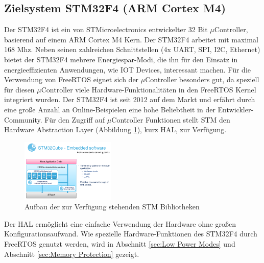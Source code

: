 \subsection{Zielsystem STM32F4 (ARM Cortex M4)}
\label{sec:Zielsysteme}
Der STM32F4 ist ein von STMicroelectronics entwickelter 32 Bit $\mu$Controller, basierend auf einem ARM Cortex M4 Kern. Der STM32F4 arbeitet mit maximal 168 Mhz. \newline
Neben seinen zahlreichen Schnittstellen (4x UART, SPI, I2C, Ethernet) bietet der STM32F4 mehrere Energiespar-Modi, die ihn für den Einsatz in energieeffizienten Anwendungen, wie IOT Devices, interessant machen. Für die Verwendung von FreeRTOS eignet sich der $\mu$Controller besonders gut, da speziell für diesen $\mu$Controller viele Hardware-Funk\-tio\-na\-li\-tät\-en in den FreeRTOS Kernel integriert wurden. Der STM32F4 ist seit 2012 auf dem Markt und erfährt durch eine große Anzahl an Online-Beispielen eine hohe Beliebtheit in der Entwickler-Community. Für den Zugriff auf $\mu$Controller Funktionen stellt STM den Hardware Abstraction Layer (Abbildung \ref{fig:HAL}), kurz HAL, zur Ver\-fü\-gung.      
\begin{figure}[htb!]
	\centering
		\includegraphics[width=0.4\textwidth]{Pictures/STM32F4/LibraryEntry.png}
	\caption{Aufbau der zur Verfügung stehenden STM Bibliotheken }
	\label{fig:HAL}
\end{figure}
\newline
Der HAL ermöglicht eine einfache Verwendung der Hardware ohne großen Konfigurationsaufwand. Wie spezielle Hardware-Funktionen des STM32F4 durch FreeRTOS genutzt werden, wird in Abschnitt \ref{sec:Low Power Modes} und Abschnitt \ref{sec:Memory Protection} gezeigt.